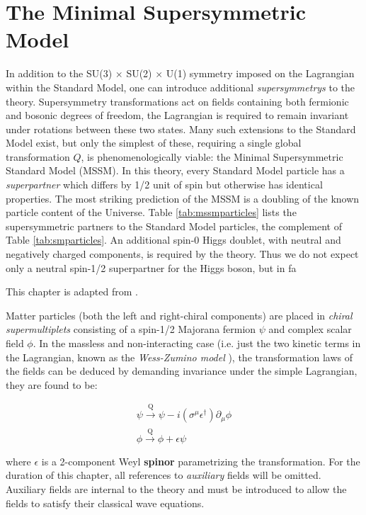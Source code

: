 \chapter{The Minimal Supersymmetric Model}
\label{chap:mssm}

In addition to the SU(3) $\times$ SU(2) $\times$ U(1) symmetry imposed on the Lagrangian within the Standard Model, one can introduce additional \textit{supersymmetrys} to the theory. Supersymmetry transformations act on fields containing both fermionic and bosonic degrees of freedom, the Lagrangian is required to remain invariant under rotations between these two states. Many such extensions to the Standard Model exist, but only the simplest of these, requiring a single global transformation $Q$, is phenomenologically viable: the Minimal Supersymmetric Standard Model (MSSM). In this theory, every Standard Model particle has a \textit{superpartner} which differs by 1/2 unit of spin but otherwise has identical properties. The most striking prediction of the MSSM is a doubling of the known particle content of the Universe. Table \ref{tab:mssmparticles} lists the supersymmetric partners to the Standard Model particles, the complement of Table \ref{tab:smparticles}. An additional spin-0 Higgs doublet, with neutral and negatively charged components, is required by the theory. Thus we do not expect only a neutral spin-1/2 superpartner for the Higgs boson, but in fa

This chapter is adapted from \cite{susyprimer}.

Matter particles (both the left and right-chiral components) are placed in \textit{chiral supermultiplets} consisting of a spin-1/2 Majorana fermion $\psi$ and complex scalar field $\phi$. In the massless and non-interacting case (i.e. just the two kinetic terms in the Lagrangian, known as the \textit{Wess-Zumino model} \cite{wesszumino}), the transformation laws of the fields can be deduced by demanding invariance under the simple Lagrangian, they are found to be:
 
\begin{equation}
\begin{array}{l}
\psi \xrightarrow[]{\text{Q}} \psi - i ( \sigma^{\mu} \epsilon^{\dagger} ) \partial_{\mu} \phi \\
\phi \xrightarrow[]{\text{Q}} \phi + \epsilon \psi \\
\end{array}
\end{equation}
where $\epsilon$ is a 2-component Weyl \textbf{spinor} parametrizing the transformation. For the duration of this chapter, all references to \textit{auxiliary} fields will be omitted. Auxiliary fields are internal to the theory and must be introduced to allow the fields to satisfy their classical wave equations.

